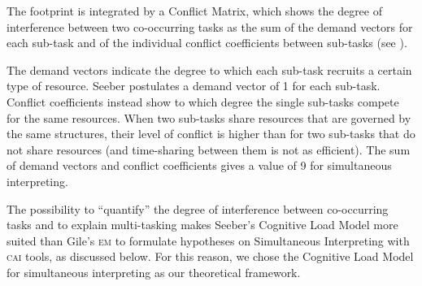 \documentclass[output=paper]{langsci/langscibook}
\begin{document}
The footprint is integrated by a Conflict Matrix, which shows the degree of interference between two co-occurring tasks as the sum of the demand vectors for each sub-task and of the individual conflict coefficients between sub-tasks (see ). 

The demand vectors indicate the degree to which each sub-task recruits a certain type of resource. Seeber postulates a demand vector of 1 for each sub-task. Conflict coefficients instead show to which degree the single sub-tasks compete for the same resources. When two sub-tasks share resources that are governed by the same structures, their level of conflict is higher than for two sub-tasks that do not share resources (and time-sharing between them is not as efficient). The sum of demand vectors and conflict coefficients gives a value of 9 for simultaneous interpreting.

The possibility to ``quantify'' the degree of interference between co-occurring tasks and to explain multi-tasking makes Seeber’s Cognitive Load Model more suited than Gile’s \textsc{em} to formulate hypotheses on Simultaneous Interpreting with \textsc{cai} tools, as discussed below. For this reason, we chose the Cognitive Load Model for simultaneous interpreting as our theoretical framework.
\end{document}
